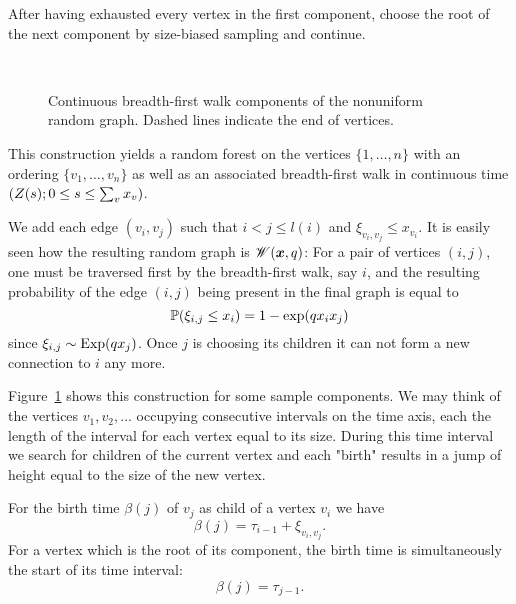 After having exhausted every vertex in the first component, 
choose the root of the next component by size-biased sampling and continue.

\begin{figure}[H]
	
	\captionsetup{width=\linewidth}
	\centering
	\\
	
	\centering
	
	\caption{Continuous breadth-first walk components of the nonuniform random graph. Dashed lines indicate the end of vertices.}
	\label{F: nonu bf-walk}
\end{figure} 

This construction yields a random forest on the vertices $\{1,  \dots, n\}$
with an ordering $\{v_1, \dots, v_n\}$ 
as well as an associated breadth-first walk in continuous time $(Z(s); 0 \leq s \leq \sum_vx_v)$.

We add each edge $(v_i, v_j)$ such that $i < j \leq l(i)$ and $\xi_{v_i, v_j} \leq x_{v_i}$.
It is easily seen how the resulting random graph is $\mathscr{W}(\boldsymbol{x}, q)$:
For a pair of vertices $(i, j)$, one must be traversed first by the breadth-first walk, say $i$,
and the resulting probability of the edge $(i,j)$ being present in the final graph is equal to
\begin{equation}
	\mathbb{P}(\xi_{i,j} \leq x_i ) = 1 - \exp(q x_i x_j)
\end{equation}
since $\xi_{i,j} \sim \operatorname*{Exp}(qx_j)$.
Once $j$ is choosing its children it can not form a new connection to $i$ any more.


Figure~\ref{F: nonu bf-walk} shows this construction for some sample components. 
We may think of the vertices $v_1, v_2, \dots$ occupying consecutive intervals on the time axis,
each the length of the interval for each vertex equal to its size.
During this time interval we search for children of the current vertex 
and each "birth" results in a jump of height equal to the size of the new vertex.

For the birth time $\beta(j)$ of $v_j$ as child of a vertex $v_i$ we have
\begin{equation}
	\beta(j) = \tau_{i-1} + \xi_{v_i, v_j}.
\end{equation}
For a vertex which is the root of its component, the birth time is simultaneously the start of its time interval:
\begin{equation}
	\beta(j) = \tau_{j-1}.
\end{equation}


